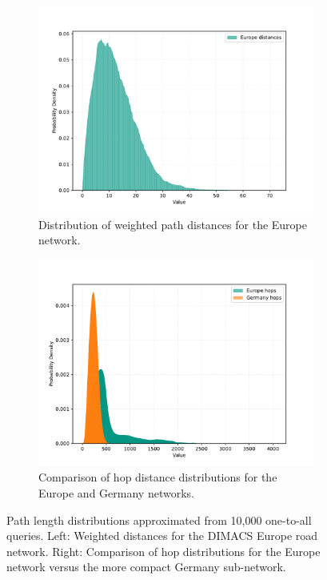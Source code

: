 \begin{figure}[tbhp]
    \centering
    \begin{subfigure}[t]{0.45\linewidth}
        \centering
        \includegraphics[width=\linewidth]{graphics/distances_europe.pdf}
        \caption{Distribution of weighted path distances for the Europe network.}
        \label{fig:distance_distribution}
    \end{subfigure}
    \hfill
    \begin{subfigure}[t]{0.45\linewidth}
        \centering
        \includegraphics[width=\linewidth]{graphics/hops_europe_germany.pdf}
        \caption{Comparison of hop distance distributions for the Europe and Germany networks.}
        \label{fig:hop_distribution}
    \end{subfigure}
    \caption{Path length distributions approximated from 10,000 one-to-all queries. Left: Weighted distances for the DIMACS Europe road network. Right: Comparison of hop distributions for the Europe network versus the more compact Germany sub-network.}
    \label{fig:distance_hop_distribution}
\end{figure}
